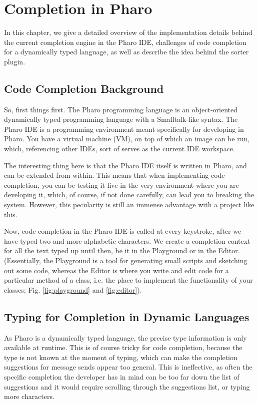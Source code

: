 \chapter{Completion in Pharo}
\label{chap:Completion in Pharo}

In this chapter, we give a detailed overview of the implementation details behind the current completion engine in the Pharo IDE, challenges of code completion for a dynamically typed language, as well as describe the idea behind the sorter plugin.

\section{Code Completion Background}
So, first things first. The Pharo programming language is an object-oriented dynamically typed programming language with a Smalltalk-like syntax. The Pharo IDE is a programming environment meant specifically for developing in Pharo. You have a virtual machine (VM), on top of which an image can be run, which, referencing other IDEs, sort of serves as the current IDE workspace.

The interesting thing here is that the Pharo IDE itself is written in Pharo, and can be extended from within. This means that when implementing code completion, you can be testing it live in the very environment where you are developing it, which, of course, if not done carefully, can lead you to breaking the system. However, this pecularity is still an immense advantage with a project like this.

Now, code completion in the Pharo IDE is called at every keystroke, after we have typed two and more alphabetic characters. We create a completion context for all the text typed up until then, be it in the Playground or in the Editor. (Essentially, the Playground is a tool for generating small scripts and sketching out some code, whereas the Editor is where you write and edit code for a particular method of a class, i.e. the place to implement the functionality of your classes; Fig. \ref{fig:playground} and \ref{fig:editor}).

\section{Typing for Completion in Dynamic Languages}
As Pharo is a dynamically typed language, the precise type information is only available at runtime. This is of course tricky for code completion, because the type is not known at the moment of typing, which can make the completion suggestions for message sends appear too general. This is ineffective, as often the specific completion the developer has in mind can be too far down the list of suggestions and it would require scrolling through the suggestions list, or typing more characters.

